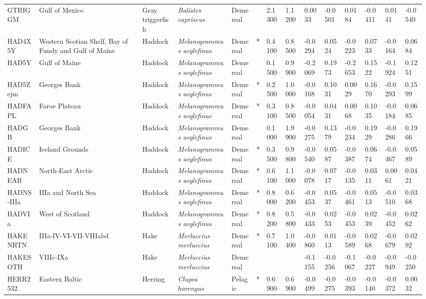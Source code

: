 \begin{longtable}{p{2.6cm}p{1.9cm}p{1.7cm}p{1.6cm}p{1cm}p{0.3cm}p{1cm}p{1cm}p{1cm}p{1.1cm}p{1cm}p{1.1cm}p{1cm}p{1.1cm}}
  GTRIGGM & Gulf of Mexico & Gray triggerfish & \textit{Balistes capriscus} & Demersal &   & 2.1300 & 1.1200 & 0.0033 & -0.0501 & 0.0184 & -0.0411 & 0.0141 & -0.0540 \\ 
  HAD4X5Y & Western Scotian Shelf, Bay of Fundy and Gulf of Maine & Haddock & \textit{Melanogrammus aeglefinus} & Demersal & * & 0.4100 & 0.8500 & -0.0294 & 0.0524 & -0.0223 & 0.0733 & -0.0164 & 0.0684 \\ 
  HAD5Y & Gulf of Maine & Haddock & \textit{Melanogrammus aeglefinus} & Demersal &   & 0.1500 & 0.9900 & -0.2069 & 0.1973 & -0.2653 & 0.1522 & -0.1924 & 0.1251 \\ 
  HAD5Zejm & Georges Bank & Haddock & \textit{Melanogrammus aeglefinus} & Demersal & * & 0.2500 & 1.0000 & -0.0168 & 0.1031 & 0.0029 & 0.1670 & -0.0293 & 0.1599 \\ 
  HADFAPL & Faroe Plateau & Haddock & \textit{Melanogrammus aeglefinus} & Demersal & * & 0.3100 & 0.8500 & -0.0054 & 0.0431 & 0.0068 & 0.1035 & -0.0184 & 0.0685 \\ 
  HADGB & Georges Bank & Haddock & \textit{Melanogrammus aeglefinus} & Demersal &   & 0.1000 & 1.9900 & -0.0275 & 0.1379 & -0.0234 & 0.1929 & -0.0286 & 0.1966 \\ 
  HADICE & Iceland Grounds & Haddock & \textit{Melanogrammus aeglefinus} & Demersal & * & 0.3500 & 0.9800 & -0.0540 & 0.0587 & -0.0387 & 0.0674 & -0.0467 & 0.0589 \\ 
  HADNEAR & North-East Arctic & Haddock & \textit{Melanogrammus aeglefinus} & Demersal & * & 0.6100 & 1.1000 & -0.0078 & 0.0717 & -0.0135 & 0.0311 & 0.0061 & 0.0421 \\ 
  HADNS-IIIa & IIIa and North Sea & Haddock & \textit{Melanogrammus aeglefinus} & Demersal & * & 0.8000 & 0.6200 & -0.0453 & 0.0537 & -0.0461 & 0.0513 & -0.0510 & 0.0368 \\ 
  HADVIa & West of Scotland & Haddock & \textit{Melanogrammus aeglefinus} & Demersal & * & 0.8200 & 0.5800 & -0.0433 & 0.0253 & -0.0453 & 0.0239 & -0.0452 & 0.0262 \\ 
  HAKENRTN & IIIa-IV-VI-VII-VIIIabd & Hake & \textit{Merluccius merluccius} & Demersal & * & 0.7100 & 1.0400 & -0.0860 & 0.0113 & -0.0589 & 0.0268 & -0.0679 & 0.0292 \\ 
  HAKESOTH & VIIIc-IXa & Hake & \textit{Merluccius merluccius} & Demersal &  &  &  & -0.1155 & -0.0256 & -0.1067 & -0.0227 & -0.0949 & -0.0250 \\ 
  HERR2532 & Eastern Baltic & Herring & \textit{Clupea harengus} & Pelagic & * & 0.6900 & 0.6900 & -0.0499 & -0.0275 & -0.0393 & -0.0140 & -0.0372 & 0.0032 \\ 

\end{longtable}
